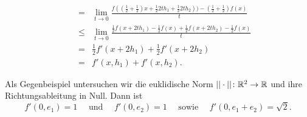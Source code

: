 \begin{compactenum}[(i)]
\begin{align*}
  &&=&\lim_{t\to 0} \frac{f((\frac{1}{2}+\frac{1}{2})x+\frac{1}{2} 2th_1+\frac{1}{2}2th_2))-(\frac{1}{2}+\frac{1}{2})f(x)}{t}\\
  &&\leq& \lim_{t\to 0} \frac{\frac{1}{2}f(x+2th_1)-\frac{1}{2}f(x)+\frac{1}{2}f(x+ 2th_2)-\frac{1}{2}f(x)}{t}\\
  &&=& \frac{1}{2} f'(x+2h_1)+\frac{1}{2} f'(x+2h_2)\\
  &&=& f'(x,h_1)+f'(x,h_2).
 \end{align*}
 \item Als Gegenbeispiel untersuchen wir die euklidische Norm $||\cdot||\colon \mathbb{R}^2\to\mathbb{R}$ und ihre Richtungsableitung in Null. Dann ist
 \begin{displaymath}
  f'(0,e_1)=1 \quad\text{ und }\quad f'(0,e_2)=1 \quad \text{ sowie }\quad f'(0, e_1+e_2)=\sqrt{2}.
 \end{displaymath}
\end{compactenum}



